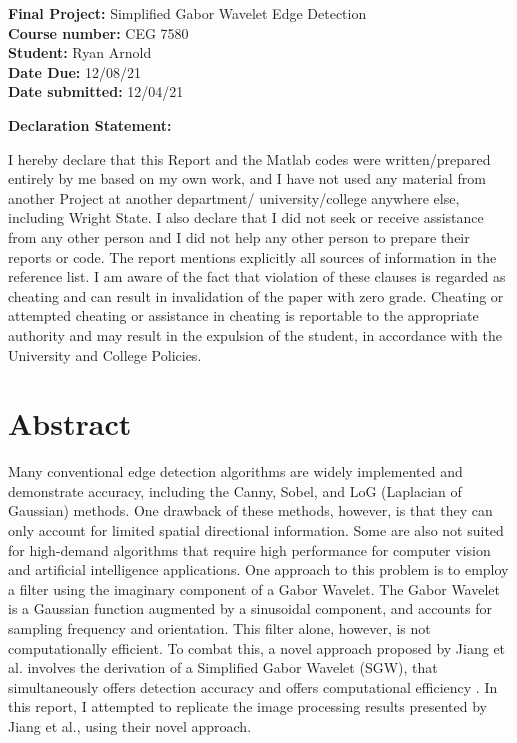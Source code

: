 \documentclass[./rarnold_final_project.tex]{subfiles}
\begin{document}


\begin{titlepage}

\noindent
\textbf{Final Project:} Simplified Gabor Wavelet Edge Detection \\
\textbf{Course number:} CEG 7580\\
\textbf{Student:} Ryan Arnold \\
\textbf{Date Due:} 12/08/21 \\
\textbf{Date submitted:} 12/04/21
\vspace{24pt}

\noindent \textbf{Declaration Statement: }

\noindent I hereby declare that this Report and the Matlab codes were written/prepared entirely by me based on my own work, and I have not used any material from another Project at another department/ university/college anywhere else, including Wright State. I also declare that I did not seek or receive assistance from any other person and I did not help any other person to prepare their reports or code.  The report mentions explicitly all sources of information in the reference list. I am aware of the fact that violation of these clauses is regarded as cheating and can result in invalidation of the paper with zero grade. Cheating or attempted cheating or assistance in cheating is reportable to the appropriate authority and may result in the expulsion of the student, in accordance with the University and College Policies.

\end{titlepage}

\tableofcontents

\clearpage
\section{Abstract}

\noindent Many conventional edge detection algorithms are widely implemented and demonstrate accuracy, including the Canny, Sobel, and LoG (Laplacian of Gaussian) methods.  One drawback of these methods, however, is that they can only account for limited spatial directional information.  Some are also not suited for high-demand algorithms that require high performance for computer vision and artificial intelligence applications.  One approach to this problem is to employ a filter using the imaginary component of a Gabor Wavelet.  The Gabor Wavelet is a Gaussian function augmented by a sinusoidal component, and accounts for sampling frequency and orientation.  This filter alone, however, is not computationally efficient.  To combat this, a novel approach proposed by Jiang et al. involves the derivation of a Simplified Gabor Wavelet (SGW), that simultaneously  offers detection accuracy and offers computational efficiency \cite{main}.  In this report, I attempted to replicate the image processing results presented by Jiang et al., using their novel approach.
\end{document}

